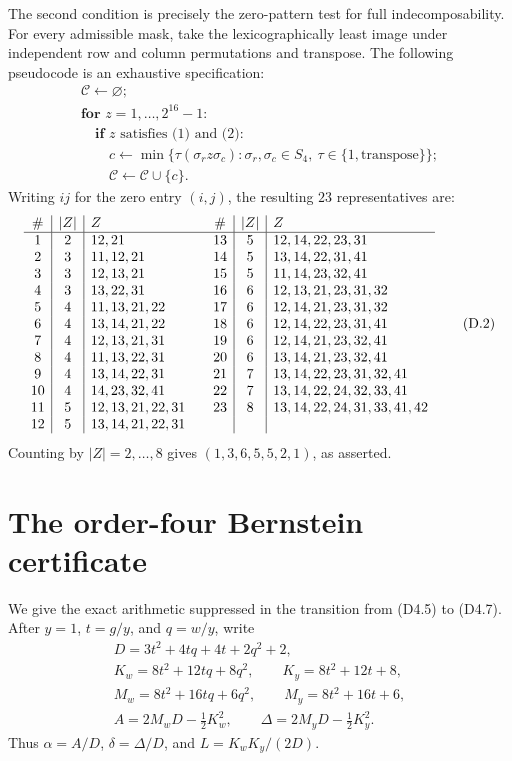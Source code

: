 \documentclass[11pt]{amsart}
\theoremstyle{definition}
\theoremstyle{remark}
\newenvironment{exacttable}
  {\begingroup\small
   \setlength{\arraycolsep}{4pt}%
   \renewcommand{\arraystretch}{1.12}}
  {\endgroup}
\begin{document}
The second condition is precisely the zero-pattern test for full
indecomposability.  For every admissible mask, take the lexicographically
least image under independent row and column permutations and transpose.
The following pseudocode is an exhaustive specification:
\[
\begin{array}{l}
\mathcal C\leftarrow\varnothing;\\
\textbf{for }z=1,\ldots,2^{16}-1:\\
\quad\textbf{if }z\text{ satisfies (1) and (2):}\\
\qquad c\leftarrow\min\{\tau(\sigma_r z\sigma_c):
 \sigma_r,\sigma_c\in S_4,\ \tau\in\{1,\text{transpose}\}\};\\
\qquad\mathcal C\leftarrow\mathcal C\cup\{c\}.
\end{array}
\tag{D.1}
\]
Writing \(ij\) for the zero entry \((i,j)\), the resulting \(23\)
representatives are:
\begin{exacttable}
\[
\begin{array}{c|c|l@{\qquad}c|c|l}
\#&|Z|&Z&\#&|Z|&Z\\ \hline
1&2&12,21&13&5&12,14,22,23,31\\
2&3&11,12,21&14&5&13,14,22,31,41\\
3&3&12,13,21&15&5&11,14,23,32,41\\
4&3&13,22,31&16&6&12,13,21,23,31,32\\
5&4&11,13,21,22&17&6&12,14,21,23,31,32\\
6&4&13,14,21,22&18&6&12,14,22,23,31,41\\
7&4&12,13,21,31&19&6&12,14,21,23,32,41\\
8&4&11,13,22,31&20&6&13,14,21,23,32,41\\
9&4&13,14,22,31&21&7&13,14,22,23,31,32,41\\
10&4&14,23,32,41&22&7&13,14,22,24,32,33,41\\
11&5&12,13,21,22,31&23&8&13,14,22,24,31,33,41,42\\
12&5&13,14,21,22,31&&&
\end{array}
\tag{D.2}
\]
\end{exacttable}
Counting by \(|Z|=2,\ldots,8\) gives
\((1,3,6,5,5,2,1)\), as asserted.

\section{The order-four Bernstein certificate}
\label{app:bernstein-certificate}

We give the exact arithmetic suppressed in the transition from (D4.5) to
(D4.7).  After \(y=1\), \(t=g/y\), and \(q=w/y\), write
\[
\begin{gathered}
D=3t^2+4tq+4t+2q^2+2,\\
K_w=8t^2+12tq+8q^2,\qquad K_y=8t^2+12t+8,\\
M_w=8t^2+16tq+6q^2,\qquad M_y=8t^2+16t+6,\\
A=2M_wD-\tfrac12K_w^2,\qquad
\Delta=2M_yD-\tfrac12K_y^2.
\end{gathered}
\]
Thus \(\alpha=A/D\), \(\delta=\Delta/D\), and
\(L=K_wK_y/(2D)\).
\end{document}

